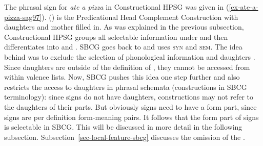 \documentclass[output=paper,biblatex,babelshorthands,newtxmath,draftmode,colorlinks,citecolor=brown]{langscibook}
\begin{document}

The phrasal sign for \emph{ate a pizza} in Constructional HPSG was given in
(\ref{ex-ate-a-pizza-sag97}). () is the Predicational Head Complement Construction with
daughters and mother filled in.
\ea
\label{feat-geom-sag2012}
\z
As was explained in the previous subsection, Constructional HPSG groups all selectable information under
\synsem and then differentiates into \cat and \cont. SBCG goes back to  and uses \textsc{syn} and
\textsc{sem}. The idea behind \synsem was to exclude the selection of phonological information and
daughters \citep[]{ps2}. Since daughters are outside of the definition of , they cannot be accessed from
within valence lists. Now, SBCG pushes this idea one step further and also restricts the access
to daughters in phrasal schemata (constructions in SBCG terminology): since signs do not have
daughters, constructions may not refer to the daughters of their parts. But obviously signs need to
have a form part, since signs are per definition form-meaning pairs. It follows that the form part of
signs is selectable in SBCG. This will be discussed in more detail in the following
subsection. Subsection~\ref{sec-local-feature-sbcg} discusses the omission of the \localf.


\end{document}
